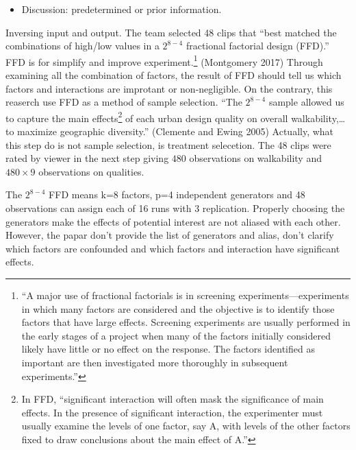\documentclass[12pt,]{article}
\providecommand{\tightlist}{%
  \setlength{\itemsep}{0pt}\setlength{\parskip}{0pt}}
\let\rmarkdownfootnote\footnote%
\def\footnote{\protect\rmarkdownfootnote}
\begin{document}
\begin{itemize}
\tightlist
\item
  Discussion: predetermined or prior information.
\end{itemize}

Inversing input and output. The team selected 48 clips that ``best
matched the combinations of high/low values in a \(2^{8-4}\) fractional
factorial design (FFD).'' FFD is for simplify and improve
experiment.\footnote{``A major use of fractional factorials is in
  screening experiments---experiments in which many factors are
  considered and the objective is to identify those factors that have
  large effects. Screening experiments are usually performed in the
  early stages of a project when many of the factors initially
  considered likely have little or no effect on the response. The
  factors identified as important are then investigated more thoroughly
  in subsequent experiments.''} (Montgomery 2017) Through examining all
the combination of factors, the result of FFD should tell us which
factors and interactions are improtant or non-negligible. On the
contrary, this reaserch use FFD as a method of sample selection. ``The
\(2^{8-4}\) sample allowed us to capture the main effects\footnote{In
  FFD, ``significant interaction will often mask the significance of
  main effects. In the presence of significant interaction, the
  experimenter must usually examine the levels of one factor, say A,
  with levels of the other factors fixed to draw conclusions about the
  main effect of A.''} of each urban design quality on overall
walkability,\ldots{}to maximize geographic diversity.'' (Clemente and
Ewing 2005) Actually, what this step do is not sample selection, is
treatment selecetion. The 48 clips were rated by viewer in the next step
giving \(480\) observations on walkability and \(480\times9\)
observations on qualities.

The \(2^{8-4}\) FFD means k=8 factors, p=4 independent generators and 48
observations can assign each of 16 runs with 3 replication. Properly
choosing the generators make the effects of potential interest are not
aliased with each other. However, the papar don't provide the list of
generators and alias, don't clarify which factors are confounded and
which factors and interaction have significant effects.
\end{document}
